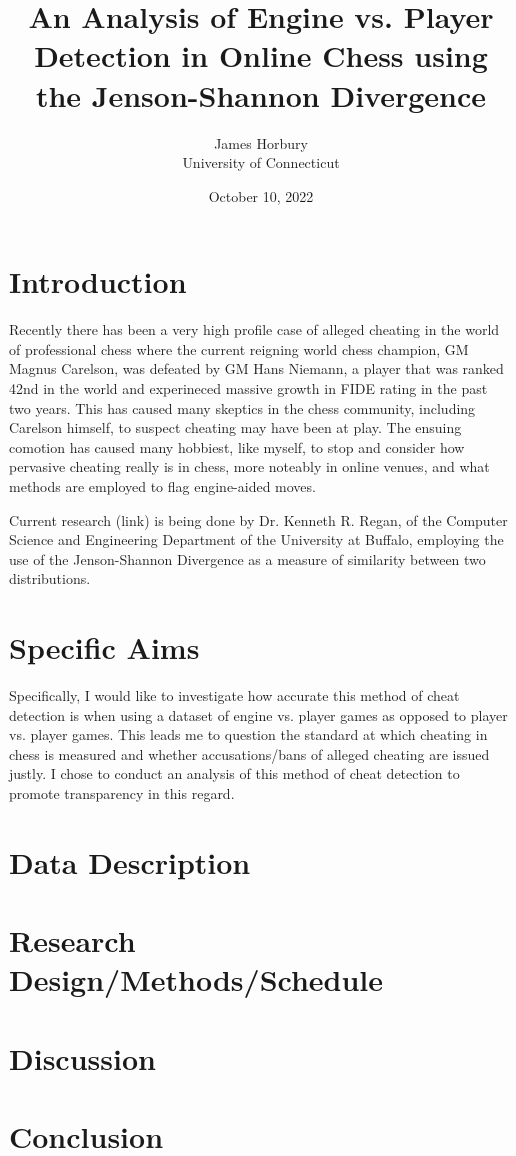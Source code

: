 \documentclass[12pt]{article}
\title{An Analysis of Engine vs. Player Detection in Online Chess using the Jenson-Shannon Divergence}
\author{James Horbury\\
    University of Connecticut
}
\date{October 10, 2022}
\begin{document}
\maketitle

\section*{Introduction}
\label{sec:intro}

Recently there has been a very high profile case of alleged cheating in the world of professional chess 
where the current reigning world chess champion, GM Magnus Carelson, was defeated by GM Hans Niemann, a player 
that was ranked 42nd in the world and experineced massive growth in FIDE rating in the past two years. This 
has caused many skeptics in the chess community, including Carelson himself, to suspect cheating may have been at
play. The ensuing comotion has caused many hobbiest, like myself, to stop and consider how pervasive cheating
really is in chess, more noteably in online venues, and what methods are employed to flag engine-aided moves.

Current research (link) is being done by Dr. Kenneth R. Regan, of the Computer Science and Engineering 
Department of the University at Buffalo, employing the use of the Jenson-Shannon Divergence as a measure of 
similarity between two distributions.

\section*{Specific Aims}
\label{sec:spec}

Specifically, I would like to investigate how accurate this method of cheat detection is when using a dataset 
of engine vs. player games as opposed to player vs. player games. This leads me to question the standard at 
which cheating in chess is measured and whether accusations/bans of alleged cheating are issued justly. I chose 
to conduct an analysis of this method of cheat detection to promote transparency in this regard.

\section*{Data Description}
\label{sec:data}



\section*{Research Design/Methods/Schedule}
\label{sec:res}

\section*{Discussion}
\label{sec:disc}

\section*{Conclusion}
\label{sec:conc}



\end{document}
